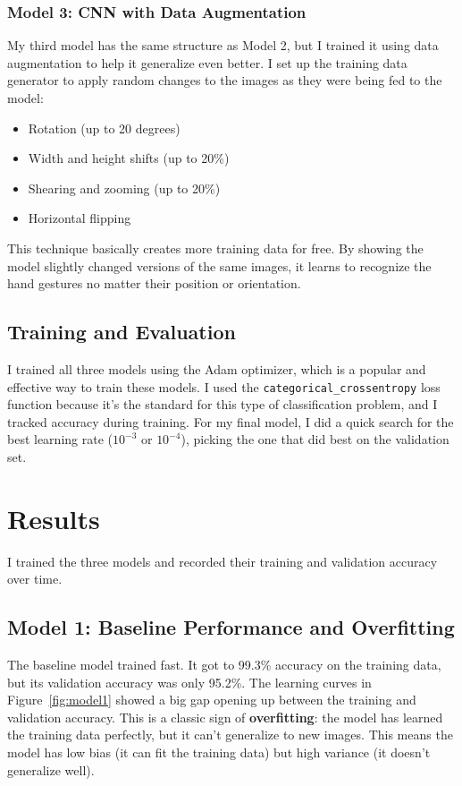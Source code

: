 \documentclass[pdflatex,sn-mathphys-num]{sn-jnl}%
\theoremstyle{thmstyleone}%
\theoremstyle{thmstyletwo}%
\theoremstyle{thmstylethree}%
\begin{document}
\subsubsection{Model 3: CNN with Data Augmentation}
My third model has the same structure as Model 2, but I trained it using data augmentation to help it generalize even better. I set up the training data generator to apply random changes to the images as they were being fed to the model:
\begin{itemize}
    \item Rotation (up to 20 degrees)
    \item Width and height shifts (up to 20\%)
    \item Shearing and zooming (up to 20\%)
    \item Horizontal flipping
\end{itemize}
This technique basically creates more training data for free. By showing the model slightly changed versions of the same images, it learns to recognize the hand gestures no matter their position or orientation.

\subsection{Training and Evaluation}
I trained all three models using the Adam optimizer, which is a popular and effective way to train these models. I used the \texttt{categorical\_crossentropy} loss function because it's the standard for this type of classification problem, and I tracked accuracy during training. For my final model, I did a quick search for the best learning rate ($10^{-3}$ or $10^{-4}$), picking the one that did best on the validation set.

\section{Results}\label{sec2}

I trained the three models and recorded their training and validation accuracy over time.

\subsection{Model 1: Baseline Performance and Overfitting}
The baseline model trained fast. It got to 99.3\% accuracy on the training data, but its validation accuracy was only 95.2\%. The learning curves in Figure~\ref{fig:model1} showed a big gap opening up between the training and validation accuracy. This is a classic sign of \textbf{overfitting}: the model has learned the training data perfectly, but it can't generalize to new images. This means the model has low bias (it can fit the training data) but high variance (it doesn't generalize well).
\end{document}
